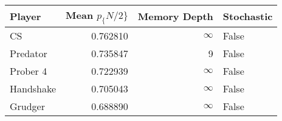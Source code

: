 \begin{tabular}{lrrl}
\toprule
    Player &  Mean $p_\{N/2\}$ &  Memory Depth & Stochastic \\
\midrule
        CS &        0.762810 &            \(\infty\) &      False \\
  Predator &        0.735847 &             9 &      False \\
  Prober 4 &        0.722939 &            \(\infty\) &      False \\
 Handshake &        0.705043 &            \(\infty\) &      False \\
   Grudger &        0.688890 &            \(\infty\) &      False \\
\bottomrule
\end{tabular}
